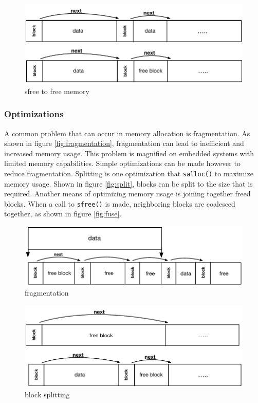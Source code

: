 \documentclass{sig-alternate}
\begin{document}
\begin{figure}[!htb]
\centering
\includegraphics[scale=.55]{figs/sfree.pdf}
\caption{sfree to free memory}
\end{figure}
\label{fig:free}
 
\subsubsection{Optimizations}

A common problem that can occur in memory allocation is fragmentation.  As shown in figure \ref{fig:fragmentation}, fragmentation can lead to inefficient and increased memory usage. This problem is magnified on embedded systems with limited memory capabilities. Simple optimizations can be made however to reduce fragmentation. Splitting is one optimization that \texttt{salloc()} to maximize memory usage. Shown in figure \ref{fig:split}, blocks can be split to the size that is required. Another means of optimizing memory usage is joining together freed blocks. When a call to \texttt{sfree()} is made, neighboring blocks are coalesced together, as shown in figure \ref{fig:fuse}.

\begin{figure}[!htb]
\centering
\includegraphics[scale=.55]{figs/fragmentation.pdf}
\caption{fragmentation}
\end{figure}
\label{fig:fragmentation}

\begin{figure}[!htb]
\centering
\includegraphics[scale=.55]{figs/split.pdf}
\caption{block splitting}
\end{figure}
\label{fig:split}
\end{document}
